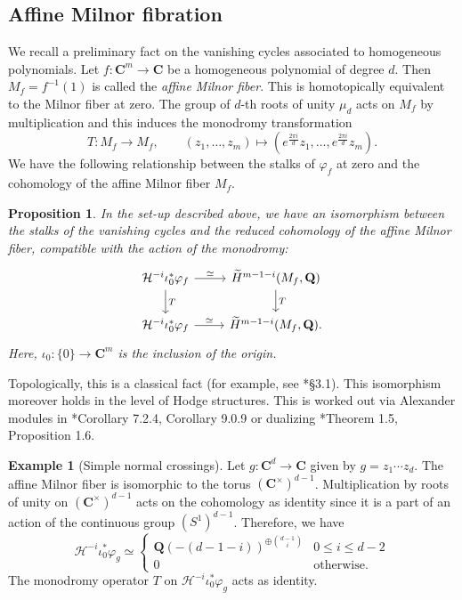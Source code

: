 \documentclass[letterpaper,11pt]{amsart}
\theoremstyle{plain}
\newtheorem{prop}[theo]{Proposition}
\theoremstyle{definition}
\newtheorem{exam}[theo]{Example}
\theoremstyle{remark}
\newcommand{\QQ}{\mathbf{Q}}
\newcommand{\CC}{\mathbf{C}}
\newcommand{\cH}{\mathcal{H}}
\newcommand{\sta}{^{*}}
\begin{document}
    \subsection{Affine Milnor fibration}
    We recall a preliminary fact on the vanishing cycles associated to homogeneous polynomials. Let $f \colon \CC^{m} \to \CC$ be a homogeneous polynomial of degree $d$. Then $M_{f} = f^{-1}(1)$ is called the \textit{affine Milnor fiber}. This is homotopically equivalent to the Milnor fiber at zero. The group of $d$-th roots of unity $\mu_{d}$ acts on $M_{f}$ by multiplication and this induces the monodromy transformation 
    $$T \colon M_{f} \to M_{f}, \qquad (z_{1},\ldots, z_{m}) \mapsto (e^{\frac{2\pi i}{d}} z_{1},\ldots, e^{\frac{2\pi i}{d}} z_{m}).$$
    We have the following relationship between the stalks of $\varphi_{f}$ at zero and the cohomology of the affine Milnor fiber $M_{f}$.

    \begin{prop} \label{prop:affine-milnor-fibre}
        In the set-up described above, we have an isomorphism between the stalks of the vanishing cycles and the reduced cohomology of the affine Milnor fiber, compatible with the action of the monodromy:
        $$\begin{tikzcd}
            \cH^{-i} \iota_{0}\sta \varphi_{f} \ar[r, "\simeq"] \ar[d, "T"] & \widetilde{H}^{m-1-i}(M_{f}, \QQ) \ar[d, "T"] \\
            \cH^{-i} \iota_{0}\sta \varphi_{f}  \ar[r, "\simeq"]  & \widetilde{H}^{m-1-i}(M_{f}, \QQ).
        \end{tikzcd}$$
        Here, $\iota_{0} \colon \{ 0\} \to \CC^{m}$ is the inclusion of the origin.
    \end{prop}
    Topologically, this is a classical fact (for example, see \cite{Dimca}*{\S3.1}). This isomorphism moreover holds in the level of Hodge structures. This is worked out via Alexander modules in \cite{Alexander-module}*{Corollary 7.2.4, Corollary 9.0.9} or dualizing \cite{Liu-nearby-vanishing-hodge-Alexander}*{Theorem 1.5, Proposition 1.6}.

    \begin{exam}[Simple normal crossings] \label{exam:snc-stalk-calculation}
        Let $g \colon \CC^{d} \to \CC$ given by $g = z_{1}\cdots z_{d}$. The affine Milnor fiber is isomorphic to the torus $(\CC^{\times})^{d-1}$. Multiplication by roots of unity on $(\CC^{\times})^{d-1}$ acts on the cohomology as identity since it is a part of an action of the continuous group $(S^{1})^{d-1}$. Therefore, we have
        $$ \cH^{-i} \iota_{0}\sta \varphi_{g} \simeq \begin{cases}
            \QQ(-(d-1-i))^{\oplus {d-1 \choose i}} & 0 \leq i \leq d-2 \\
            0 & \text{otherwise.}
        \end{cases} $$
        The monodromy operator $T$ on $\cH^{-i}\iota_{0}\sta \varphi_{g}$ acts as identity.
    \end{exam}
\end{document}
